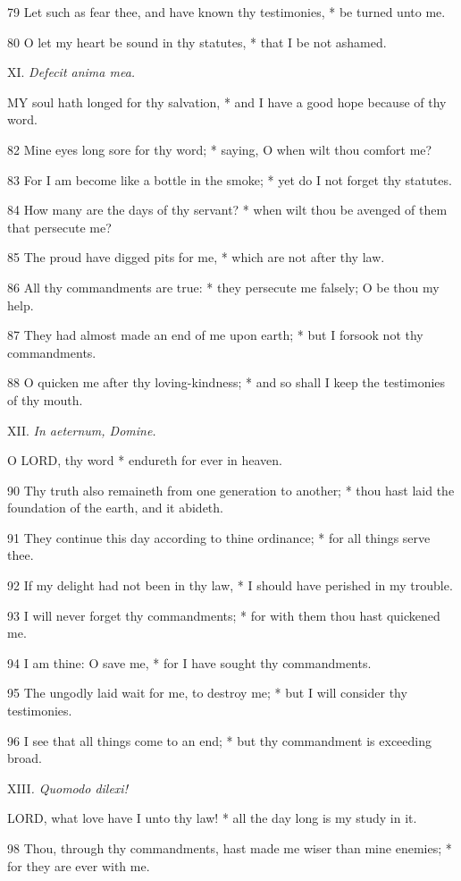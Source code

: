79 Let such as fear thee, and have known thy testimonies,
* be turned unto me.

80 O let my heart be sound in thy statutes, * that
I be not ashamed.

XI. \emph{Defecit
anima mea.}

MY
soul hath longed for thy salvation, * and I have a good hope because of
thy word.

82 Mine eyes long sore for thy word; * saying, O when
wilt thou comfort me?

83 For I am become like a bottle in the smoke; * yet
do I not forget thy statutes.

84 How many are the days of thy servant? * when wilt
thou be avenged of them that persecute me?

85 The proud have digged pits for me, * which are not
after thy law.

86 All thy commandments are true: * they persecute
me falsely; O be thou my help.

87 They had almost made an end of me upon earth; *
but I forsook not thy commandments.

88 O quicken me after thy loving-kindness; * and so
shall I keep the testimonies of thy mouth.

XII.
\emph{In aeternum, Domine.}

O
LORD, thy word * endureth for ever in heaven. 

90 Thy truth also remaineth from one generation to
another; * thou hast laid the foundation of the earth, and it abideth.

91 They continue this day according to thine ordinance;
* for all things serve thee.

92 If my delight had not been in thy law, * I should
have perished in my trouble.

93 I will never forget thy commandments; * for with
them thou hast quickened me.

94 I am thine: O save me, * for I have sought thy commandments.

95 The ungodly laid wait for me, to destroy me; * but
I will consider thy testimonies.

96 I see that all things come to an end; * but thy
commandment is exceeding broad.

XIII\emph{.
Quomodo dilexi!}

LORD,
what love have I unto thy law! * all the day long is my study in it.

98 Thou, through thy commandments, hast made me wiser
than mine enemies; * for they are ever with me.

